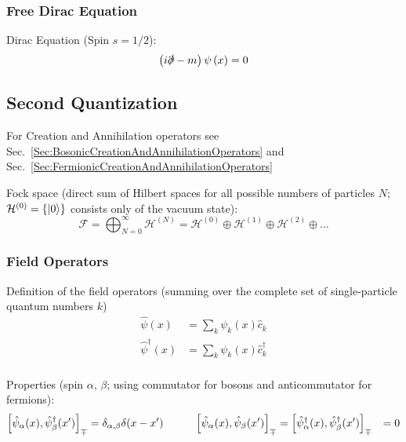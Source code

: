 		\subsubsection{Free Dirac Equation}
			\noindent
			Dirac Equation (Spin $s=1/2$):
			\begin{equation}
				\left(  i\slashed{\partial} - m  \right) \psi\left( x \right) = 0
			\end{equation}

	\subsection{Second Quantization}
		For Creation and Annihilation operators see Sec.~\ref{Sec:BosonicCreationAndAnnihilationOperators} and Sec.~\ref{Sec:FermionicCreationAndAnnihilationOperators}

		\noindent
		Fock space (direct sum of Hilbert spaces for all possible numbers of particles $N$; $\mathcal{H}^{(0)} = \left\lbrace \Ket{0} \right\rbrace$ consists only of the vacuum state):
		\begin{equation}
			\mathcal{F}
			= \bigoplus_{N=0}^{\infty} \mathcal{H}^{(N)}
			= \mathcal{H}^{(0)} \oplus \mathcal{H}^{(1)} \oplus \mathcal{H}^{(2)} \oplus ...
		\end{equation}


		\subsubsection{Field Operators}
			Definition of the field operators (summing over the complete set of single-particle quantum numbers $k$)
			\begin{equation}
				\begin{aligned}
					\hat{\psi} (x) &= \sum_k \psi_k(x) \hat{c}_k \\
					\hat{\psi}^\dagger (x) &= \sum_k \psi_k(x) \hat{c}_k^\dagger \\
				\end{aligned}
			\end{equation}

			\noindent
			Properties (spin $\alpha$, $\beta$; using commutator for bosons and anticommutator for fermions):
			\begin{equation}
				\begin{aligned}
					\comm{\hat{\psi}_\alpha(x)}{\hat{\psi}_\beta^\dagger(x')}_\mp &= \delta_{\alpha,\beta} \delta(x-x')
					&\hspace{20pt}
					\comm{\hat{\psi}_\alpha(x)}{\hat{\psi}_\beta(x')}_\mp
					&= \comm{\hat{\psi}_\alpha^\dagger(x)}{\hat{\psi}_\beta^\dagger(x')}_\mp
					&= 0
				\end{aligned}
			\end{equation}

